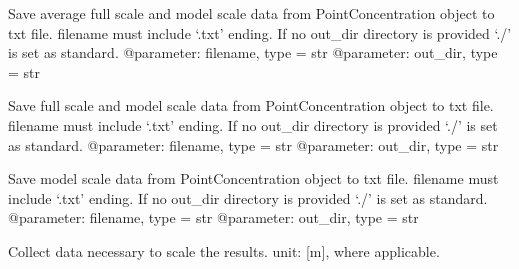 \documentclass[letterpaper,10pt,english]{sphinxmanual}
\begin{document}
\begin{fulllineitems}
\begin{fulllineitems}
\label{\detokenize{index:windtunnel.PointConcentration.save2file_avg}}
Save average full scale and model scale data from
PointConcentration object to txt file. filename must include ‘.txt’
ending. If no out\_dir directory is provided ‘./’ is set as standard.
@parameter: filename, type = str
@parameter: out\_dir, type = str

\end{fulllineitems}


\begin{fulllineitems}
\label{\detokenize{index:windtunnel.PointConcentration.save2file_fs}}
Save full scale and model scale data from PointConcentration object
to txt file. filename must include ‘.txt’ ending. If no out\_dir
directory is provided ‘./’ is set as standard.
@parameter: filename, type = str
@parameter: out\_dir, type = str

\end{fulllineitems}


\begin{fulllineitems}
\label{\detokenize{index:windtunnel.PointConcentration.save2file_ms}}
Save model scale data from PointConcentration object to txt file.
filename must include ‘.txt’ ending. If no out\_dir directory is
provided ‘./’ is set as standard.
@parameter: filename, type = str
@parameter: out\_dir, type = str

\end{fulllineitems}


\begin{fulllineitems}
\label{\detokenize{index:windtunnel.PointConcentration.scaling_information}}
Collect data necessary to scale the results. unit: {[}m{]}, where
applicable.


\end{fulllineitems}
\end{fulllineitems}
\end{document}
